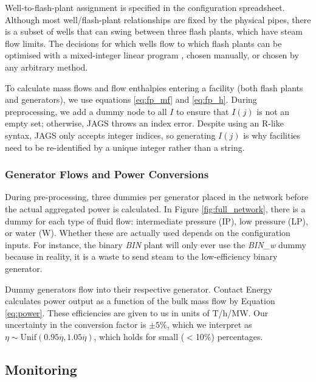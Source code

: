 \documentclass[a4paper, 12pt]{article}
\begin{document}
\begin{figure}
\begin{minipage}[t]{.48\textwidth}
  \label{fig:production_curve}
\end{minipage}
\end{figure}

Well-to-flash-plant assignment is specified in the configuration spreadsheet. Although most well/flash-plant relationships are fixed by the physical pipes, there is a subset of wells that can swing between three flash plants, which have steam flow limits. The decisions for which wells flow to which flash plants can be optimised with a mixed-integer linear program \cite{Fox:2018}, chosen manually, or chosen by any arbitrary method.

To calculate mass flows and flow enthalpies entering a facility (both flash plants and generators), we use equations \ref{eq:fp_mf} and \ref{eq:fp_h}. During preprocessing, we add a dummy node to all $I$ to ensure that $I(j)$ is not an empty set; otherwise, JAGS throws an index error. Despite using an R-like syntax, JAGS only accepts integer indices, so generating $I(j)$ is why facilities need to be re-identified by a unique integer rather than a string. 

\subsubsection{Generator Flows and Power Conversions}
During pre-processing, three dummies per generator placed in the network before the actual aggregated power is calculated. In Figure \ref{fig:full_network}, there is a dummy for each type of fluid flow: intermediate pressure (IP), low pressure (LP), or water (W). Whether these are actually used depends on the configuration inputs. For instance, the binary \emph{BIN} plant will only ever use the \emph{BIN\_w} dummy because in reality, it is a waste to send steam to the low-efficiency binary generator.

Dummy generators flow into their respective generator. Contact Energy calculates power output as a function of the bulk mass flow by Equation \ref{eq:power}. These efficiencies are given to us in units of T/h/MW. Our uncertainty in the conversion factor is $\pm5\%$, which we interpret as $\eta \sim \text{Unif}\left( 0.95\overline\eta, 1.05\overline\eta \right)$, which holds for small ($<$10\%) percentages.

\subsection{Monitoring}
\end{document}
